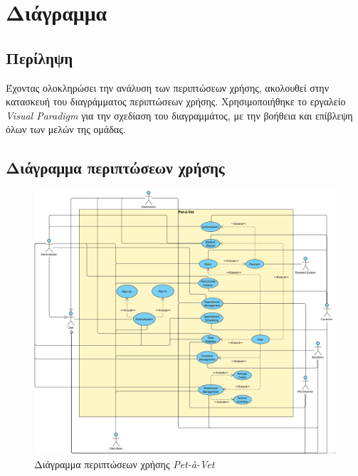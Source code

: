 \documentclass[12pt,a4paper,twoside]{book}
\begin{document}
\chapter{Διάγραμμα} %

\section{Περίληψη}

Έχοντας ολοκληρώσει την ανάλυση των περιπτώσεων χρήσης, ακολουθεί στην κατασκευή του διαγράμματος περιπτώσεων χρήσης. Χρησιμοποιήθηκε το εργαλείο \textit{Visual Paradigm} για την σχεδίαση του διαγραμμάτος, με την βοήθεια και επίβλεψη όλων των μελών της ομάδας. %

\section{Διάγραμμα περιπτώσεων χρήσης}

\begin{figure}[H]
  \centering
  \includegraphics[width=1\textwidth]{../Resources/Use-casel-v0.1.png}
  \caption{Διάγραμμα περιπτώσεων χρήσης \textit{Pet-à-Vet}}\label{fig:use-case-diagram}
\end{figure}
\end{document}
